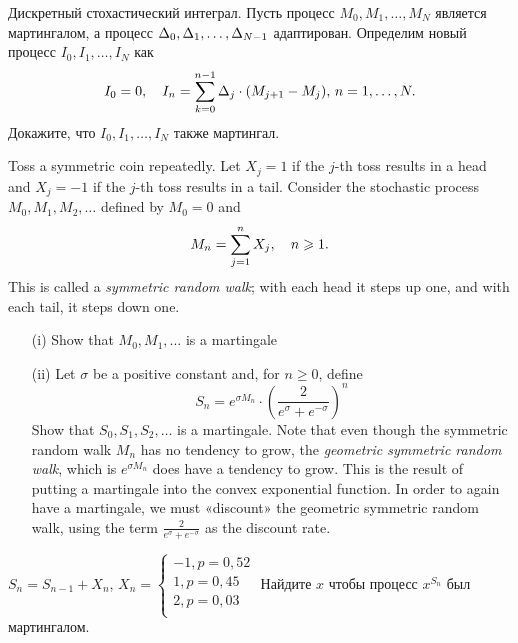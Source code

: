 \begin{problem}
 Дискретный стохастический интеграл. Пусть процесс $M_0,M_1,\dots,M_N$ является
  мартингалом, а процесс $\Delta_0,\Delta_1,\dots,\Delta_{N-1}$ адаптирован. Определим новый процесс
  $I_0,I_1,\dots,I_N$ как
 \[
  I_0=0,\quad I_n=\sum\limits_{k=0}^{n-1} \Delta_j\cdot (M_{j+1}-M_j),\, n=1,\dots,N.
\]
  \ni Докажите, что $I_0,I_1,\dots,I_N$ также мартингал.

\begin{sol}

\end{sol}
\end{problem}

\begin{problem}
 Toss a symmetric coin repeatedly. Let $X_j=1$ if the $j$-th toss
results in a head and $X_j=-1$ if the $j$-th toss results in a tail. Consider the
stochastic process $M_0,M_1,M_2,\dots$ defined by $M_0=0$ and
\[
M_n=\sum\limits_{j=1}^{n} X_j,\quad n\geqslant 1.
\]
\ni This is called a \emph{symmetric random walk}; with each head it steps up one,
and with each tail, it steps down one.

\begin{enumerate}
\item[(i)] Show that $M_0,M_1,\dots$ is a martingale

\item[(ii)] Let $\sigma$ be a positive constant and, for $n\ge 0$, define
\[
S_n=e^{\sigma M_n}\cdot\left(\frac{2}{e^{\sigma}+e^{-\sigma}} \right)^n
\]
\ni Show that $S_0,S_1,S_2,\dots$ is a martingale. Note that even though the symmetric random
walk $M_n$ has no tendency to grow, the \emph{geometric symmetric random walk}, which is
$e^{\sigma M_n}$ does have a tendency to grow. This is the result of putting a martingale into
the convex exponential function. In order to again have a martingale, we must «discount» the
geometric symmetric random walk, using the term  $\frac{2}{e^{\sigma}+e^{-\sigma}}$ as the discount rate.
\end{enumerate}

\begin{sol}

\end{sol}
\end{problem}

\begin{problem}
 [Steele, 2.1.]
$S_{n}=S_{n-1}+X_{n}$,
$X_{n}=
\begin{cases}
	-1, p=0,52 \\
	1, p=0,45 \\
	2, p=0,03 \\
\end{cases} $
Найдите $x$ чтобы процесс $x^{S_{n}}$ был мартингалом.

\begin{sol}

\end{sol}
\end{problem}

